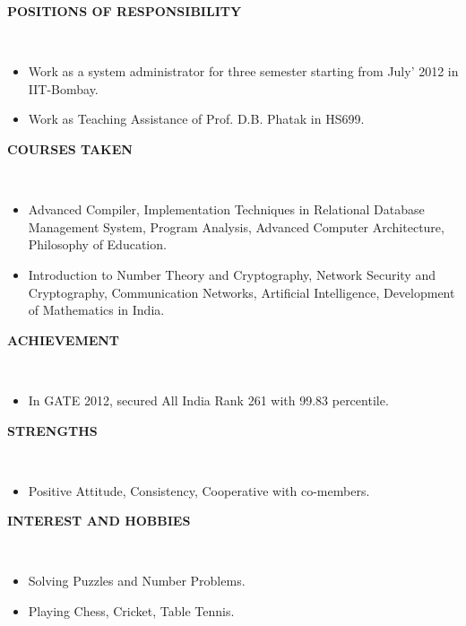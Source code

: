 \documentclass[letterpaper,10pt]{article}
\newcommand{\isep}{-2 pt}
\newcommand{\lsep}{-0.5cm}
\newcommand{\resheading}[1]{{\small \colorbox{mygrey}{\begin{minipage}{0.975\textwidth}{\textbf{#1 \vphantom{p\^{E}}}}\end{minipage}}}}
\begin{document}
\resheading{\textbf{POSITIONS OF RESPONSIBILITY} }\\[\lsep]
\begin{itemize}\itemsep \isep
\item Work as a system administrator for three semester starting from July' 2012 in IIT-Bombay.

\item Work as Teaching Assistance of Prof. D.B. Phatak in HS699.
\end{itemize}

\resheading{\textbf{COURSES TAKEN} }\\[\lsep]
\begin{itemize}
\item Advanced Compiler, Implementation Techniques in Relational Database Management System, Program Analysis, Advanced Computer Architecture, Philosophy of Education. 
\item Introduction to Number Theory and Cryptography, Network Security and Cryptography, Communication Networks, Artificial Intelligence, Development of Mathematics in India.
\end{itemize}

\resheading{\textbf{ACHIEVEMENT} }\\[\lsep]
\begin{itemize}
\item \noindent In GATE 2012, secured All India Rank 261 with 99.83 percentile.
\end{itemize}

\resheading{\textbf{STRENGTHS} }\\[\lsep]
\begin{itemize}
\item \noindent Positive Attitude, Consistency, Cooperative with co-members.
\end{itemize}

\resheading{\textbf{INTEREST AND HOBBIES} }\\[\lsep]
\begin{itemize}
\item \noindent Solving Puzzles and Number Problems.
\item \noindent Playing Chess, Cricket, Table Tennis.

\end{itemize}
\end{document}
